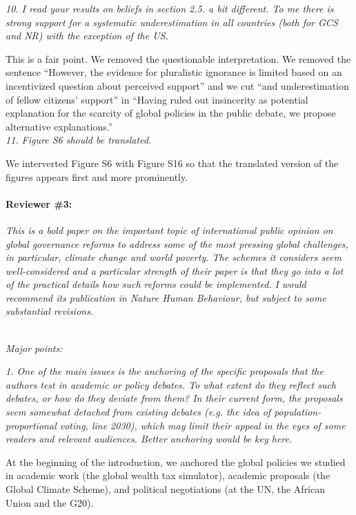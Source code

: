 \documentclass[12pt,english]{article}
\begin{document}
\textit{10. I read your results on beliefs in section 2.5. a bit different. To me there is strong support for a systematic underestimation in all countries (both for GCS and NR) with the exception of the US.}

This is a fair point. We removed the questionable interpretation. We removed the sentence ``However, the evidence for pluralistic ignorance is limited based on an incentivized question about perceived support'' and we cut ``and underestimation of fellow citizens' support'' in ``Having ruled out insincerity %
as potential explanation for the scarcity of global policies in the public debate, we propose alternative explanations.''
~\\

\textit{11. Figure S6 should be translated.}

We interverted Figure S6 with Figure S16 so that the translated version of the figures appears first and more prominently.
~\\

\paragraph*{Reviewer \#3:}
\textit{This is a bold paper on the important topic of international public opinion on global governance reforms to address some of the most pressing global challenges, in particular, climate change and world poverty. The schemes it considers seem well-considered and a particular strength of their paper is that they go into a lot of the practical details how such reforms could be implemented. I would recommend its publication in Nature Human Behaviour, but subject to some substantial revisions.}

~\\

\textit{Major points:}

\textit{1. One of the main issues is the anchoring of the specific proposals that the authors test in academic or policy debates. To what extent do they reflect such debates, or how do they deviate from them? In their current form, the proposals seem somewhat detached from existing debates (e.g. the idea of population-proportional voting, line 2030), which may limit their appeal in the eyes of some readers and relevant audiences. Better anchoring would be key here.}

At the beginning of the introduction, we anchored the global policies we studied in academic work (the global wealth tax simulator), academic proposals (the Global Climate Scheme), and political negotiations (at the UN, the African Union and the G20).  
\end{document}

